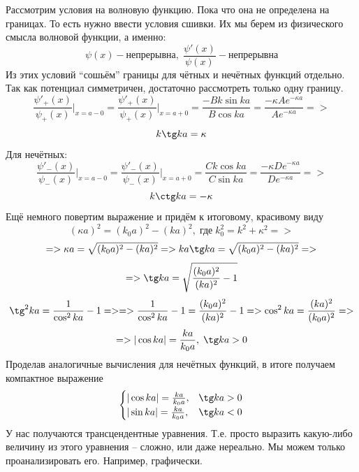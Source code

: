 Рассмотрим условия на волновую функцию. Пока что она не определена на границах. То есть нужно ввести условия сшивки. Их мы берем из физического смысла волновой функции, а именно:
\[
\psi(x) - \text{непрерывна},\; \frac{\psi'(x)}{\psi(x)} - \text{непрерывна}
\]
Из этих условий ``сошьём'' границы для чётных и нечётных функций отдельно. Так как потенциал симметричен, достаточно рассмотреть только одну границу. 
\[
\frac{\psi'_+(x)}{\psi_+(x)}\bigg|_{x=a-0} = \frac{\psi'_+(x)}{\psi_+(x)}\bigg|_{x=a+0} = \frac{-Bk\sin ka}{B\cos ka} = \frac{-\kappa A e^{-\kappa a}}{Ae^{-\kappa a}} =>
\]
\[
k\tg ka = \kappa
\]
Для нечётных:
\[
\frac{\psi'_-(x)}{\psi_-(x)}\bigg|_{x=a-0} = \frac{\psi'_-(x)}{\psi_-(x)}\bigg|_{x=a+0} = \frac{Ck\cos ka}{C\sin ka} = \frac{-\kappa D e^{-\kappa a}}{De^{-\kappa a}} =>
\]
\[
k\ctg ka = -\kappa
\]
Ещё немного повертим выражение и придём к итоговому, красивому виду
\[
(\kappa a)^2 = (k_0a)^2 - (ka)^2, \; \text{где} \;k_0^2 = k^2 + \kappa^2 =>  
\]
\[
=> \kappa a = \sqrt{(k_0a)^2 - (ka)^2} => ka\tg ka = \sqrt{(k_0a)^2 - (ka)^2} =>
\]
\[
=> \tg ka = \sqrt{\frac{(k_0a)^2}{(ka)^2} - 1}
\]
\[
\tg^2 ka = \frac{1}{\cos^2 ka} - 1 =>
=> \frac{1}{\cos^2 ka} - 1 = \frac{(k_0 a)^2}{(ka)^2} - 1 => \cos^2 ka = \frac{(ka)^2}{(k_0 a)^2} =>
\]
\[
=> |\cos ka| = \frac{ka}{k_0a}, \; \tg ka>0
\]
Проделав аналогичные вычисления для нечётных функций, в итоге получаем компактное выражение
\[
\begin{cases}
   |\cos ka| = \frac{ka}{k_0a},& \tg ka>0 \\
   |\sin ka| = \frac{ka}{k_0a},& \tg ka<0 \\
\end{cases}
\]
У нас получаются трансцендентные уравнения. Т.е. просто выразить какую-либо величину из этого уравнения – сложно, или даже нереально. Мы можем только проанализировать его. Например, графически.
